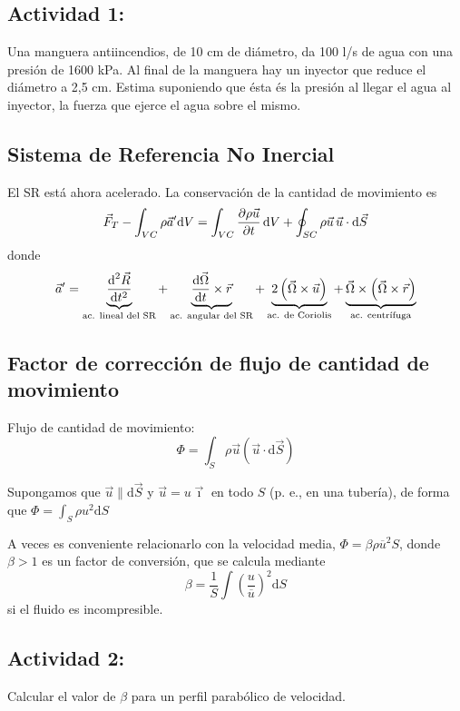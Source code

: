 	
	\subsection*{Actividad 1:}
		Una manguera antiincendios, de 10 cm de diámetro, da 100 l/s de
		agua con una presión de 1600 kPa. Al final de la manguera hay un inyector
		que reduce el diámetro a 2,5 cm. Estima suponiendo que ésta és la
		presión al llegar el agua al inyector, la fuerza que ejerce el agua
		sobre el mismo.


\subsection{Sistema de Referencia No Inercial}
	
	El SR está ahora acelerado. La conservación de la cantidad de movimiento
	es 
	\[
	\vec{F}_{T}-\int_{VC}\rho\vec{a}'\text{d}V=\int_{VC}\frac{\partial \rho\vec{u}}{\partial t}\,\text{d}V+\oint_{SC}\rho\vec{u}\,\vec{u}\cdot\text{d}\vec{S}
	\]
	donde 
	\[
	\vec{a}'=\underbrace{\frac{\text{d}^{2}\vec{R}}{\text{d}t^{2}}}_{\text{ac. lineal del SR}}+\underbrace{\deriv{\vec{\Omega}}{t}\times\vec{r}}_{\text{ac. angular del SR}}+\underbrace{2\left(\vec{\Omega}\times\vec{u}\right)}_{\text{ac. de Coriolis}}+\underbrace{\vec{\Omega}\times\left(\vec{\Omega}\times\vec{r}\right)}_{\text{ac. centr\'\i fuga}}
	\]
	


\subsection{Factor de corrección de flujo de cantidad de movimiento}

	
	Flujo de cantidad de movimiento: 
	\[
	\Phi=\int_{S}\rho\vec{u}\left(\vec{u}\cdot\text{d}\vec{S}\right)
	\]
	
	Supongamos que $\vec{u}\parallel\text{d}\vec{S}$ y $\vec{u}=u\vec{\imath}$
	en todo $S$ (p. e., en una tubería), de forma que $\Phi=\int_{S}\rho u^{2}\text{d}S$
	
	A veces es conveniente relacionarlo con la velocidad media, $\Phi=\beta\rho\overline{u}^{2}S$,
	donde $\beta>1$ es un factor de conversión, que se calcula mediante
	\[
	\beta=\frac{1}{S}\int\left(\frac{u}{\overline{u}}\right)^{2}\text{d}S
	\]
	si el fluido es incompresible.
	\subsection*{Actividad 2:}
		
		Calcular el valor de $\beta$ para un perfil parabólico de velocidad. 

